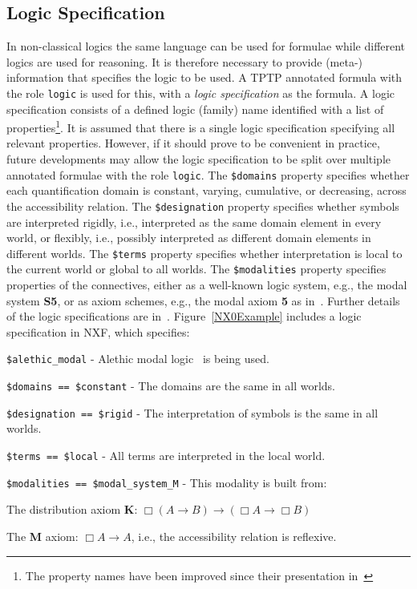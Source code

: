 \documentclass{ceurart}
\newenvironment{packed_itemize}{
\vspace*{-0.3em}
\begin{itemize}
\setlength{\partopsep}{0pt}
\setlength{\itemsep}{1pt}
\setlength{\parskip}{0pt}
\setlength{\parsep}{0pt}
}{\end{itemize}}
\begin{document}
\subsection{Logic Specification}
\label{LogicSpecification}

In non-classical logics the same language can be used for formulae while different logics are 
used for reasoning.
It is therefore necessary to provide \mbox{(meta-)} information that specifies the
logic to be used.
A TPTP annotated formula with the role \texttt{logic} is used for this, with a {\em logic 
specification} as the formula.
A logic specification consists of a defined logic (family) name identified with a list of 
properties\footnote{%
The property names have been improved since their presentation in~\cite{SF+22}}. It
is assumed that there is a single logic specification specifying all relevant properties.
However, if it should prove to be convenient in practice, future developments may allow the logic
specification to be split over multiple annotated formulae with the role \texttt{logic}.
The {\tt \$domains} property specifies whether each quantification domain is constant, varying,
cumulative, or decreasing, across the accessibility relation.
The {\tt \$designation} property specifies whether symbols are interpreted rigidly, i.e., 
interpreted as the same domain element in every world, or flexibly, i.e., possibly interpreted 
as different domain elements in different worlds. 
The {\tt \$terms} property specifies whether interpretation is local to the current world or
global to all worlds.
The {\tt \$modalities} property specifies properties of the connectives, either as a well-known 
logic system, e.g., the modal system {\bf S5}, or as axiom schemes, e.g., the modal axiom {\bf 5} 
as in~\cite{Gar18}.
Further details of the logic specifications are in~\cite{SF+22}.
Figure~\ref{NX0Example} includes a logic specification in NXF, which specifies:
\begin{packed_itemize}
\item {\tt \$alethic\_modal} - Alethic modal logic~\cite{Men15} is being used.
\item {\tt \$domains == \$constant} - The domains are the same in all worlds.
\item {\tt \$designation == \$rigid} - The interpretation of symbols is the same in all worlds.
\item {\tt \$terms == \$local} - All terms are interpreted in the local world.
\item {\tt \$modalities == \$modal\_system\_M} - This modality is built from:
      \begin{packed_itemize}
      \item The distribution axiom {\bf K}: 
            $\Box (A \rightarrow B) \rightarrow (\Box A \rightarrow \Box B)$
      \item The {\bf M} axiom: $\Box A \rightarrow A$, i.e., the accessibility relation is 
            reflexive.
      \end{packed_itemize}
\end{packed_itemize}
\end{document}
